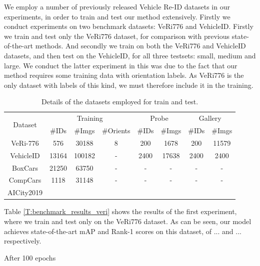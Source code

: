 \documentclass[10pt,twocolumn,letterpaper]{article}
\begin{document}
We employ a number of previously released Vehicle Re-ID datasets in our experiments, in order to train and test our method extensively. Firstly we conduct experiments on two benchmark datasets: VeRi776 and VehicleID. Firstly we train and test only the VeRi776 dataset, for comparison with previous state-of-the-art methods. And secondly we train on both the VeRi776 and VehicleID datasets, and then test on the VehicleID, for all three testsets: small, medium and large. We conduct the latter experiment in this was due to the fact that our method requires some training data with orientation labels. As VeRi776 is the only dataset with labels of this kind, we must therefore include it in the training.

\begin{table}
  \centering
  \begin{tabular}{c || c | c | c || c | c || c | c}
    \hline
    \multirow{2}{*}{Dataset} & \multicolumn{3}{c||}{Training} & \multicolumn{2}{c||}{Probe} & \multicolumn{2}{c}{Gallery} \\
    \cline{2-7}
    & \#IDs& \#Imgs & \#Orients & \#IDs & \#Imgs & \#IDs & \#Imgs \\
    \hline
    VeRi-776 \cite{} & 576 & 30188 & 8 & 200 & 1678 & 200 & 11579 \\
    VehicleID \cite{} & 13164 & 100182 & - & 2400 & 17638 & 2400 & 2400 \\
    BoxCars \cite{} & 21250 & 63750 & -  & - & - & - & - \\
    CompCars \cite{} & 1118 & 31148 & - & - & - & - & - \\
    AICity2019 \cite{} & \\
    \hline
  \end{tabular}
  \caption{Details of the datasets employed for train and test.}
  \label{T:dataset_details}
\end{table}

Table \ref{T:benchmark_results_veri} shows the results of the first experiment, where we train and test only on the VeRi776 dataset. As can be seen, our model achieves state-of-the-art mAP and Rank-1 scores on this dataset, of ... and ... respectively.

After 100 epochs
\end{document}

